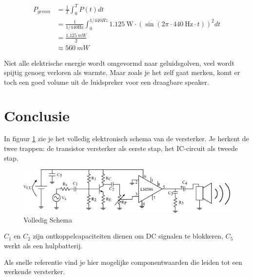 \documentclass{article}
\begin{document}
			\begin{align}
			P_{gemm} &= \frac{1}{T} \int_0^T P(t) dt \\ 
			& = \frac{1}{1/440 \text{Hz}} \int_0^{1/440Hz} 1.125~\text{W} \cdot \left( \sin \left(2\pi \cdot 440~\text{Hz} \cdot t\right) \right)^2 dt \\&= \frac{1.125~mW}{2} \\ 
			& \approx 560~mW
			\end{align}


			Niet alle elektrische energie  wordt omgevormd naar geluidsgolven, veel wordt spijtig genoeg verloren als warmte. Maar zoals je het zelf gaat merken, komt er toch een goed volume uit de luidspreker voor een draagbare speaker.
	\section{Conclusie}

		In figuur \ref{fig:volledig_schema} zie je het volledig elektronisch schema van de versterker. Je herkent de twee trappen: de transistor versterker als eerste stap, het IC-circuit als tweede stap. 
		\begin{figure}[htbp]
			\centering
			\includegraphics[width=\linewidth]{volledig_schema}
			\caption{Volledig Schema}
			\label{fig:volledig_schema}
		\end{figure}
		$C_1$ en $C_2$ zijn ontkoppelcapaciteiten dienen om DC signalen te blokkeren, $C_5$ werkt als een hulpbatterij.

		Als snelle referentie vind je hier mogelijke componentwaarden die leiden tot een werkende versterker.

		\begin{center}
			\noindent {}
		\end{center}
\end{document}
